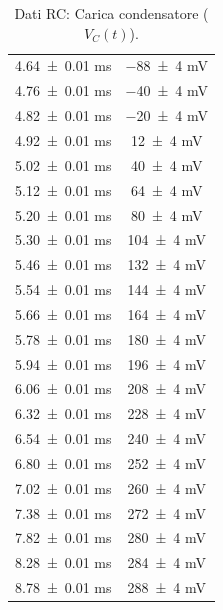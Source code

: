 \documentclass[a4paper]{article}
\begin{document}
\begin{appendices}
\begin{table}[htbp]
\begin{minipage}{0.48\textwidth}
\begin{tabular}{|c|c|}
        \num{4.64 \pm 0.01} \si{\milli\second} & \num{-88 \pm 4} \si{\milli\volt} \\
        \num{4.76 \pm 0.01} \si{\milli\second} & \num{-40 \pm 4} \si{\milli\volt} \\
        \num{4.82 \pm 0.01} \si{\milli\second} & \num{-20 \pm 4} \si{\milli\volt} \\
        \num{4.92 \pm 0.01} \si{\milli\second} & \num{12 \pm 4} \si{\milli\volt} \\
        \num{5.02 \pm 0.01} \si{\milli\second} & \num{40 \pm 4} \si{\milli\volt} \\
        \num{5.12 \pm 0.01} \si{\milli\second} & \num{64 \pm 4} \si{\milli\volt} \\
        \num{5.20 \pm 0.01} \si{\milli\second} & \num{80 \pm 4} \si{\milli\volt} \\
        \num{5.30 \pm 0.01} \si{\milli\second} & \num{104 \pm 4} \si{\milli\volt} \\
        \num{5.46 \pm 0.01} \si{\milli\second} & \num{132 \pm 4} \si{\milli\volt} \\
        \num{5.54 \pm 0.01} \si{\milli\second} & \num{144 \pm 4} \si{\milli\volt} \\
        \num{5.66 \pm 0.01} \si{\milli\second} & \num{164 \pm 4} \si{\milli\volt} \\
        \num{5.78 \pm 0.01} \si{\milli\second} & \num{180 \pm 4} \si{\milli\volt} \\
        \num{5.94 \pm 0.01} \si{\milli\second} & \num{196 \pm 4} \si{\milli\volt} \\
        \num{6.06 \pm 0.01} \si{\milli\second} & \num{208 \pm 4} \si{\milli\volt} \\
        \num{6.32 \pm 0.01} \si{\milli\second} & \num{228 \pm 4} \si{\milli\volt} \\
        \num{6.54 \pm 0.01} \si{\milli\second} & \num{240 \pm 4} \si{\milli\volt} \\
        \num{6.80 \pm 0.01} \si{\milli\second} & \num{252 \pm 4} \si{\milli\volt} \\
        \num{7.02 \pm 0.01} \si{\milli\second} & \num{260 \pm 4} \si{\milli\volt} \\
        \num{7.38 \pm 0.01} \si{\milli\second} & \num{272 \pm 4} \si{\milli\volt} \\
        \num{7.82 \pm 0.01} \si{\milli\second} & \num{280 \pm 4} \si{\milli\volt} \\
        \num{8.28 \pm 0.01} \si{\milli\second} & \num{284 \pm 4} \si{\milli\volt} \\
        \num{8.78 \pm 0.01} \si{\milli\second} & \num{288 \pm 4} \si{\milli\volt} \\
        \hline
        \end{tabular}
        \caption{Dati RC: Carica condensatore ($V_C(t)$).}
        \label{tab:rc_data_carica_c}
    \end{minipage}
\end{table}


\end{appendices}
\end{document}
